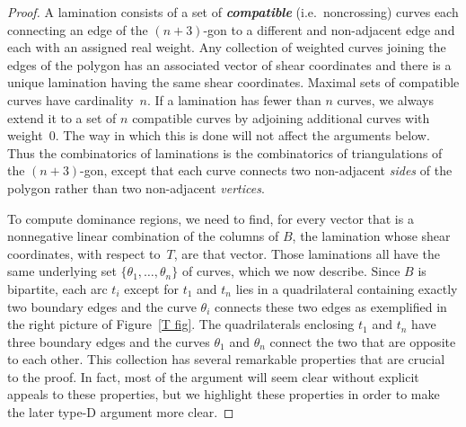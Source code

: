 \documentclass{amsart}
\theoremstyle{definition}
\theoremstyle{remark}
\numberwithin{equation}{section}
\newcommand{\newword}[1]{\textbf{\emph{#1}}}
\newcommand{\set}[1]{{\lbrace #1 \rbrace}}
\newcommand{\0}{{\mathbf{0}}}
\begin{document}
\begin{proof}
A lamination consists of a set of \newword{compatible} (i.e.\ noncrossing) curves each connecting an edge of the $(n+3)$-gon to a different and non-adjacent edge and each with an assigned real weight.
Any collection of weighted curves joining the edges of the polygon has an associated vector of shear coordinates and there is a unique lamination having the same shear coordinates.
Maximal sets of compatible curves have cardinality~$n$.
If a lamination has fewer than $n$ curves, we always extend it to a set of $n$ compatible curves by adjoining additional curves with weight~$0$.
The way in which this is done will not affect the arguments below.
Thus the combinatorics of laminations is the combinatorics of triangulations of the $(n+3)$-gon, except that each curve connects two non-adjacent \emph{sides} of the polygon rather than two non-adjacent \emph{vertices}.

To compute dominance regions, we need to find, for every vector that is a nonnegative linear combination of the columns of $B$, the lamination whose shear coordinates, with respect to~$T$, are that vector.
Those laminations all have the same underlying set $\set{\theta_1,\ldots,\theta_n}$ of curves, which we now describe.
Since $B$ is bipartite, each arc $t_i$ except for $t_1$ and $t_n$ lies in a quadrilateral containing exactly two boundary edges and the curve $\theta_i$ connects these two edges as exemplified in the right picture of Figure~\ref{T fig}.
The quadrilaterals enclosing $t_1$ and $t_n$ have three boundary edges and the curves $\theta_1$ and $\theta_n$ connect the two that are opposite to each other. 
This collection has several remarkable properties that are crucial to the proof.  
In fact, most of the argument will seem clear without explicit appeals to these properties, but we highlight these properties in order to make the later type-D argument more clear.


\end{proof}
\end{document}
